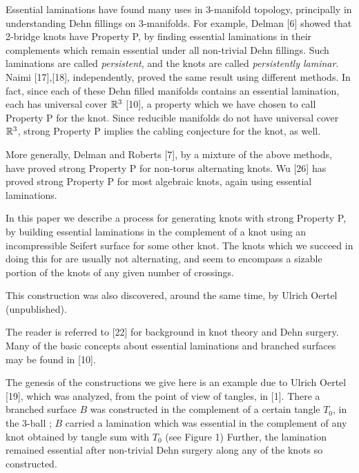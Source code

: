 {}
\vglue 5pt

Essential laminations have found many uses in 3-manifold topology, 
principally in understanding Dehn fillings on 3-manifolds. For 
example, Delman [6] showed that 2-bridge knots have Property P, by 
finding essential laminations in their complements which remain 
essential under all non-trivial Dehn fillings. Such laminations are 
called {\it persistent}, and the knots are
called {\it persistently laminar}. Naimi [17],[18], independently, proved the same 
result using different methods. In fact, since each of these Dehn filled 
manifolds contains an essential lamination, each has universal cover 
${\Bbb R}^3$ [10], a property which we have chosen to call 
 Property P for the knot. Since reducible manifolds do 
not have universal cover ${\Bbb R}^3$, strong Property P implies the 
cabling conjecture for the knot, as well.

More generally, Delman and Roberts [7], by a mixture of the
above methods, have proved strong 
Property P for non-torus alternating knots. Wu [26] has proved 
strong Property P for most algebraic knots, again using essential 
laminations.

In this paper we describe a process for generating knots with strong 
Property P, by building essential laminations in the complement of a 
knot using an incompressible Seifert surface for some other knot. The 
knots which we succeed in doing this for are usually not alternating, 
and seem to encompass a sizable portion of the knots
of any given number of crossings. 

This construction was also discovered,
around the same time, by Ulrich Oertel (unpublished).

\vfill\eject

\vglue 12pt
\vglue 5pt

The reader is referred to [22] for background in knot theory and Dehn 
surgery. Many of the basic concepts about essential laminations and 
branched surfaces may be found in [10].

\ssk

The genesis of the constructions we give here is an example due to 
Ulrich Oertel
[19], which was analyzed, from the point of view of tangles, in 
[1]. There a branched surface $B$ was 
constructed in the complement of a certain tangle $T_0$, in the 
3-ball \bethr; $B$ carried a lamination \clsp which was essential in 
the complement of any knot obtained by tangle sum with $T_0$ (see 
Figure 1) Further, the lamination remained essential after 
non-trivial Dehn surgery along any of the knots so constructed.

